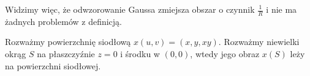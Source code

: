 \begin{frame}
Widzimy więc, że odwzorowanie Gaussa zmiejsza obszar o czynnik $\frac{1}{R}$ i nie ma żadnych problemów z definicją.
\begin{center}

\end{center}

\end{frame}
\begin{frame}
\begin{przyklad}
Rozważmy powierzchnię siodłową $x(u,v)=(x,y,xy)$. Rozważmy niewielki okrąg $S$ na płaszczyźnie $z=0$ i środku w $(0,0)$, wtedy jego obraz $x(S)$ leży na powierzchni siodłowej.  


\end{przyklad}

\end{frame}

